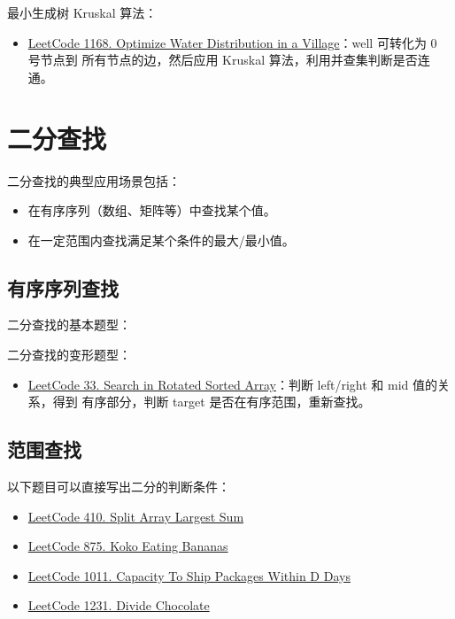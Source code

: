 最小生成树 Kruskal 算法：
\begin{itemize}
  \item 
    \href{https://leetcode.com/problems/optimize-water-distribution-in-a-village}{LeetCode
      1168. Optimize Water Distribution in a Village}：well 可转化为 0 号节点到
    所有节点的边，然后应用 Kruskal 算法，利用并查集判断是否连通。
\end{itemize}

\section{二分查找}
二分查找的典型应用场景包括：

\begin{itemize}
  \item 在有序序列（数组、矩阵等）中查找某个值。
  \item 在一定范围内查找满足某个条件的最大/最小值。
\end{itemize}

\subsection{有序序列查找}
二分查找的基本题型：

二分查找的变形题型：
\begin{itemize}
  \item
    \href{https://leetcode.com/problems/search-in-rotated-sorted-array/}{LeetCode
      33. Search in Rotated Sorted Array}：判断 left/right 和 mid 值的关系，得到
    有序部分，判断 target 是否在有序范围，重新查找。
\end{itemize}

\subsection{范围查找}
以下题目可以直接写出二分的判断条件：

\begin{itemize}
  \label{lc:bs-range-general}
  \item
    \href{https://leetcode.com/problems/split-array-largest-sum/}{LeetCode 410. Split Array Largest Sum}
  \item
    \href{https://leetcode.com/problems/koko-eating-bananas/}{LeetCode 875. Koko Eating Bananas}
  \item
    \href{https://leetcode.com/problems/capacity-to-ship-packages-within-d-days/}{LeetCode
      1011. Capacity To Ship Packages Within D Days}
  \item
    \href{https://leetcode.com/problems/divide-chocolate}{LeetCode 1231. Divide Chocolate}
\end{itemize}

